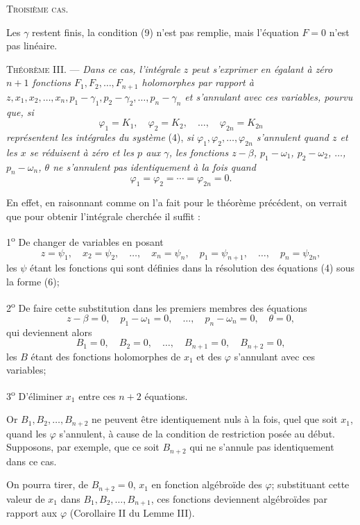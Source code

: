 \documentclass[11pt]{article}
\begin{document}
\begin{center}
\textsc{Troisième cas.}
\end{center}

Les $\gamma$ restent finis, la condition (9) n’est pas remplie, mais l’équation $F=0$ n’est pas linéaire.

\medskip
\noindent\textsc{Théorème III.} — \emph{Dans ce cas, l’intégrale $z$ peut s’exprimer en égalant à zéro $n+1$ fonctions $F_1,F_2,\ldots,F_{n+1}$ holomorphes par rapport à $z,x_1,x_2,\ldots,x_n,p_1-\gamma_1,p_2-\gamma_2,\ldots,p_n-\gamma_n$ et s’annulant avec ces variables, pourvu que, si}
\[
\varphi_1=K_1,\quad \varphi_2=K_2,\quad \ldots,\quad \varphi_{2n}=K_{2n}
\]
\emph{représentent les intégrales du système} (4), \emph{si $\varphi_1,\varphi_2,\ldots,\varphi_{2n}$ s’annulent quand $z$ et les $x$ se réduisent à zéro et les $p$ aux $\gamma$, les fonctions $z-\beta$, $p_1-\omega_1$, $p_2-\omega_2$, $\ldots$, $p_n-\omega_n$, $\theta$ ne s’annulent pas identiquement à la fois quand}
\[
\varphi_1=\varphi_2=\cdots=\varphi_{2n}=0.
\]

En effet, en raisonnant comme on l’a fait pour le théorème précédent, on verrait que pour obtenir l’intégrale cherchée il suffit :

1\textsuperscript{o} De changer de variables en posant
\[
z=\psi_1,
\quad x_2=\psi_2,
\quad \ldots,
\quad x_n=\psi_n,
\quad p_1=\psi_{n+1},
\quad \ldots,
\quad p_n=\psi_{2n},
\]
les $\psi$ étant les fonctions qui sont définies dans la résolution des équations (4) sous la forme (6);

2\textsuperscript{o} De faire cette substitution dans les premiers membres des équations
\[
z-\beta=0,
\quad p_1-\omega_1=0,
\quad \ldots,
\quad p_n-\omega_n=0,
\quad \theta=0,
\]
qui deviennent alors
\[
B_1=0,
\quad B_2=0,
\quad \ldots,
\quad B_{n+1}=0,
\quad B_{n+2}=0,
\]
les $B$ étant des fonctions holomorphes de $x_1$ et des $\varphi$ s’annulant avec ces variables;

3\textsuperscript{o} D’éliminer $x_1$ entre ces $n+2$ équations.

Or $B_1,B_2,\ldots,B_{n+2}$ ne peuvent être identiquement nuls à la fois, quel que soit $x_1$, quand les $\varphi$ s’annulent, à cause de la condition de restriction posée au début. Supposons, par exemple, que ce soit $B_{n+2}$ qui ne s’annule pas identiquement dans ce cas.

On pourra tirer, de $B_{n+2}=0$, $x_1$ en fonction algébroïde des $\varphi$; substituant cette valeur de $x_1$ dans $B_1,B_2,\ldots,B_{n+1}$, ces fonctions deviennent algébroïdes par rapport aux $\varphi$ (Corollaire II du Lemme III).
\end{document}
